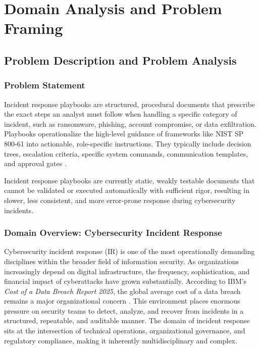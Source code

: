 \chapter*{Domain Analysis and Problem Framing}
{}

\section{Problem Description and Problem Analysis}

\subsection{Problem Statement}
Incident response playbooks are structured, procedural documents that prescribe the exact steps an analyst must follow when handling a specific category of incident, such as ransomware, phishing, account compromise, or data exfiltration.
Playbooks operationalize the high-level guidance of frameworks like NIST SP 800-61 into actionable, role-specific instructions.
They typically include decision trees, escalation criteria, specific system commands, communication templates, and approval gates \citep{sans2021}.

Incident response playbooks are currently static, weakly testable documents that cannot be validated or executed automatically with sufficient rigor, resulting in slower, less consistent, and more error-prone response during cybersecurity incidents.

\subsection{Domain Overview: Cybersecurity Incident Response}

Cybersecurity incident response (IR) is one of the most operationally demanding disciplines within the broader field of information security.
As organizations increasingly depend on digital infrastructure, the frequency, sophistication, and financial impact of cyberattacks have grown substantially.
According to IBM's \textit{Cost of a Data Breach Report 2025}, the global average cost of a data breach remains a major organizational concern \autocite{ibm2025}.
This environment places enormous pressure on security teams to detect, analyze, and recover from incidents in a structured, repeatable, and auditable manner.
The domain of incident response sits at the intersection of technical operations, organizational governance, and regulatory compliance, making it inherently multidisciplinary and complex.

